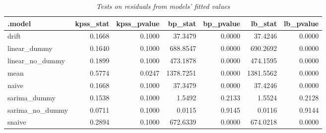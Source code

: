 \begin{table}[!h]
    \centering
    \caption{\small \textit{Tests on residuals from models' fitted values}}
    \centering
    \begin{tabular}[t]{lrrrrrr}
    \toprule
    .model & kpss\_stat & kpss\_pvalue & bp\_stat & bp\_pvalue & lb\_stat & lb\_pvalue\\
    \midrule
    drift & 0.1668 & 0.1000 & 37.3479 & 0.0000 & 37.4246 & 0.0000\\
    linear\_dummy & 0.1640 & 0.1000 & 688.8547 & 0.0000 & 690.2692 & 0.0000\\
    linear\_no\_dummy & 0.1899 & 0.1000 & 473.1878 & 0.0000 & 474.1595 & 0.0000\\
    mean & 0.5774 & 0.0247 & 1378.7251 & 0.0000 & 1381.5562 & 0.0000\\
    naive & 0.1668 & 0.1000 & 37.3479 & 0.0000 & 37.4246 & 0.0000\\
    \addlinespace
    sarima\_dummy & 0.1538 & 0.1000 & 1.5492 & 0.2133 & 1.5524 & 0.2128\\
    sarima\_no\_dummy & 0.0711 & 0.1000 & 0.0115 & 0.9145 & 0.0116 & 0.9144\\
    snaive & 0.2894 & 0.1000 & 672.6339 & 0.0000 & 674.0218 & 0.0000\\
    \bottomrule
    \end{tabular}
\end{table}

